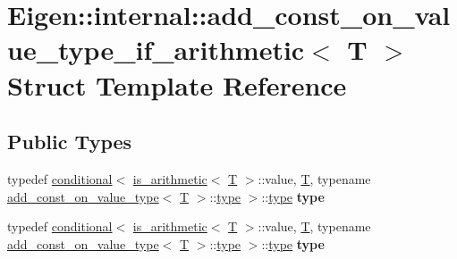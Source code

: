 \hypertarget{struct_eigen_1_1internal_1_1add__const__on__value__type__if__arithmetic}{}\section{Eigen\+:\+:internal\+:\+:add\+\_\+const\+\_\+on\+\_\+value\+\_\+type\+\_\+if\+\_\+arithmetic$<$ T $>$ Struct Template Reference}
\label{struct_eigen_1_1internal_1_1add__const__on__value__type__if__arithmetic}
\subsection*{Public Types}
\begin{DoxyCompactItemize}
\item 
\mbox{\label{struct_eigen_1_1internal_1_1add__const__on__value__type__if__arithmetic_a04d1c7ab227090e635f5f986fa356c7d}} 
typedef \hyperlink{struct_eigen_1_1internal_1_1conditional}{conditional}$<$ \hyperlink{struct_eigen_1_1internal_1_1is__arithmetic}{is\+\_\+arithmetic}$<$ \hyperlink{group___sparse_core___module}{T} $>$\+::value, \hyperlink{group___sparse_core___module}{T}, typename \hyperlink{struct_eigen_1_1internal_1_1add__const__on__value__type}{add\+\_\+const\+\_\+on\+\_\+value\+\_\+type}$<$ \hyperlink{group___sparse_core___module}{T} $>$\+::\hyperlink{class_eigen_1_1internal_1_1_tensor_lazy_evaluator_writable}{type} $>$\+::\hyperlink{class_eigen_1_1internal_1_1_tensor_lazy_evaluator_writable}{type} {\bfseries type}
\item 
\mbox{\label{struct_eigen_1_1internal_1_1add__const__on__value__type__if__arithmetic_a04d1c7ab227090e635f5f986fa356c7d}} 
typedef \hyperlink{struct_eigen_1_1internal_1_1conditional}{conditional}$<$ \hyperlink{struct_eigen_1_1internal_1_1is__arithmetic}{is\+\_\+arithmetic}$<$ \hyperlink{group___sparse_core___module}{T} $>$\+::value, \hyperlink{group___sparse_core___module}{T}, typename \hyperlink{struct_eigen_1_1internal_1_1add__const__on__value__type}{add\+\_\+const\+\_\+on\+\_\+value\+\_\+type}$<$ \hyperlink{group___sparse_core___module}{T} $>$\+::\hyperlink{class_eigen_1_1internal_1_1_tensor_lazy_evaluator_writable}{type} $>$\+::\hyperlink{class_eigen_1_1internal_1_1_tensor_lazy_evaluator_writable}{type} {\bfseries type}
\end{DoxyCompactItemize}


